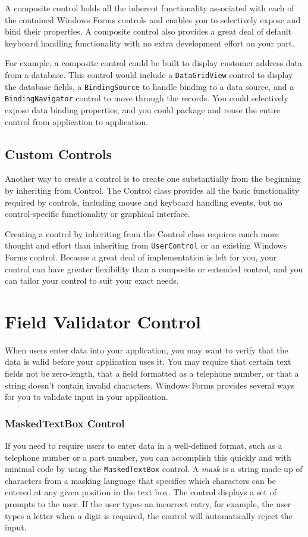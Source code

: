 A composite control holds all the inherent functionality associated with each of the contained Windows Forms controls and enables you to selectively expose and bind their properties. A composite control also provides a great deal of default keyboard handling functionality with no extra development effort on your part.

For example, a composite control could be built to display customer address data from a database. This control would include a \texttt{DataGridView} control to display the database fields, a \texttt{BindingSource} to handle binding to a data source, and a \texttt{BindingNavigator} control to move through the records. You could selectively expose data binding properties, and you could package and reuse the entire control from application to application.


\subsection*{Custom Controls}
Another way to create a control is to create one substantially from the beginning by inheriting from Control. The Control class provides all the basic functionality required by controls, including mouse and keyboard handling events, but no control-specific functionality or graphical interface.

Creating a control by inheriting from the Control class requires much more thought and effort than inheriting from \texttt{UserControl} or an existing Windows Forms control. Because a great deal of implementation is left for you, your control can have greater flexibility than a composite or extended control, and you can tailor your control to suit your exact needs.

\section{Field Validator Control}
When users enter data into your application, you may want to verify that the data is valid before your application uses it. You may require that certain text fields not be zero-length, that a field formatted as a telephone number, or that a string doesn't contain invalid characters. Windows Forms provides several ways for you to validate input in your application.

\subsubsection*{MaskedTextBox Control}
If you need to require users to enter data in a well-defined format, such as a telephone number or a part number, you can accomplish this quickly and with minimal code by using the \texttt{MaskedTextBox} control. A \textit{mask} is a string made up of characters from a masking language that specifies which characters can be entered at any given position in the text box. The control displays a set of prompts to the user. If the user types an incorrect entry, for example, the user types a letter when a digit is required, the control will automatically reject the input.

